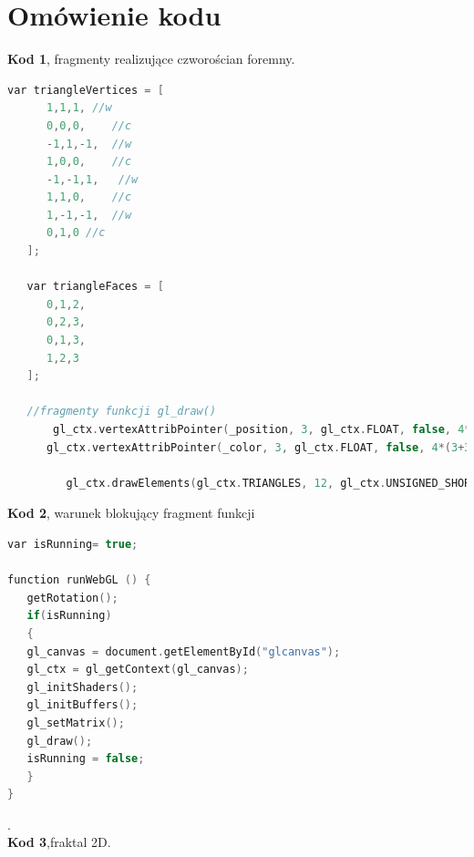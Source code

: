 \documentclass[polish,polish,a4paper]{article}
\begin{document}
  \section{Omówienie kodu}
   \textbf{Kod 1}, fragmenty realizujące czworościan foremny.
{\small
\begin{lstlisting}[language=C++]
var triangleVertices = [
      1,1,1, //w
      0,0,0,    //c
      -1,1,-1,  //w
      1,0,0,    //c 
      -1,-1,1,   //w
      1,1,0,	//c
      1,-1,-1,	//w
      0,1,0	//c
   ];
   
   var triangleFaces = [
      0,1,2,
      0,2,3,
	  0,1,3,
	  1,2,3
   ];
   
   //fragmenty funkcji gl_draw()
       gl_ctx.vertexAttribPointer(_position, 3, gl_ctx.FLOAT, false, 4*(3+3), 0);
      gl_ctx.vertexAttribPointer(_color, 3, gl_ctx.FLOAT, false, 4*(3+3), 3*4);
   
         gl_ctx.drawElements(gl_ctx.TRIANGLES, 12, gl_ctx.UNSIGNED_SHORT, 0);


\end{lstlisting}
}
\textbf{Kod 2}, warunek blokujący fragment funkcji    
{\small
\begin{lstlisting}[language=C++]
	var isRunning= true;

function runWebGL () {
   getRotation();
   if(isRunning)
   {
   gl_canvas = document.getElementById("glcanvas");
   gl_ctx = gl_getContext(gl_canvas);
   gl_initShaders();
   gl_initBuffers();
   gl_setMatrix();
   gl_draw();
   isRunning = false;
   }
}
\end{lstlisting}
}
.\\
\textbf{Kod 3},fraktal 2D.
\end{document}
